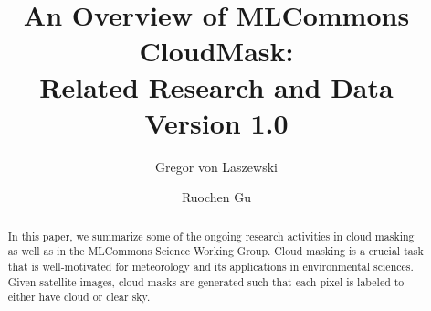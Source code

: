 \documentclass[sigplan,screen]{acmart}
\begin{document}
\newcommand{\TITLE}{An Overview of MLCommons CloudMask: \\ Related Research and Data \\ {\normalsize Version 1.0}}

\title[Overview of MLCommons CloudMask: Related Research]{\TITLE}

\author{Gregor von Laszewski}

\author{Ruochen Gu}

\renewcommand{\shortauthors}{von Laszewski et al.}

\begin{abstract}

In this paper, we summarize some of the ongoing research activities in cloud masking as well as in the MLCommons Science Working Group.
Cloud masking is a crucial task that is well-motivated for meteorology and its applications in environmental sciences. Given satellite images, cloud masks are generated such that each pixel is labeled to either have cloud or clear sky. 

\end{abstract}

\end{document}
